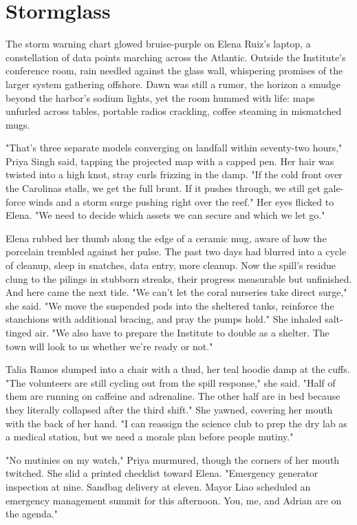 \chapter{Stormglass}

The storm warning chart glowed bruise-purple on Elena Ruiz's laptop, a constellation of data points marching across the Atlantic. Outside the Institute's conference room, rain needled against the glass wall, whispering promises of the larger system gathering offshore. Dawn was still a rumor, the horizon a smudge beyond the harbor's sodium lights, yet the room hummed with life: maps unfurled across tables, portable radios crackling, coffee steaming in mismatched mugs.

"That's three separate models converging on landfall within seventy-two hours," Priya Singh said, tapping the projected map with a capped pen. Her hair was twisted into a high knot, stray curls frizzing in the damp. "If the cold front over the Carolinas stalls, we get the full brunt. If it pushes through, we still get gale-force winds and a storm surge pushing right over the reef." Her eyes flicked to Elena. "We need to decide which assets we can secure and which we let go."

Elena rubbed her thumb along the edge of a ceramic mug, aware of how the porcelain trembled against her pulse. The past two days had blurred into a cycle of cleanup, sleep in snatches, data entry, more cleanup. Now the spill's residue clung to the pilings in stubborn streaks, their progress measurable but unfinished. And here came the next tide. "We can't let the coral nurseries take direct surge," she said. "We move the suspended pods into the sheltered tanks, reinforce the stanchions with additional bracing, and pray the pumps hold." She inhaled salt-tinged air. "We also have to prepare the Institute to double as a shelter. The town will look to us whether we're ready or not."

Talia Ramos slumped into a chair with a thud, her teal hoodie damp at the cuffs. "The volunteers are still cycling out from the spill response," she said. "Half of them are running on caffeine and adrenaline. The other half are in bed because they literally collapsed after the third shift." She yawned, covering her mouth with the back of her hand. "I can reassign the science club to prep the dry lab as a medical station, but we need a morale plan before people mutiny."

"No mutinies on my watch," Priya murmured, though the corners of her mouth twitched. She slid a printed checklist toward Elena. "Emergency generator inspection at nine. Sandbag delivery at eleven. Mayor Liao scheduled an emergency management summit for this afternoon. You, me, and Adrian are on the agenda."

